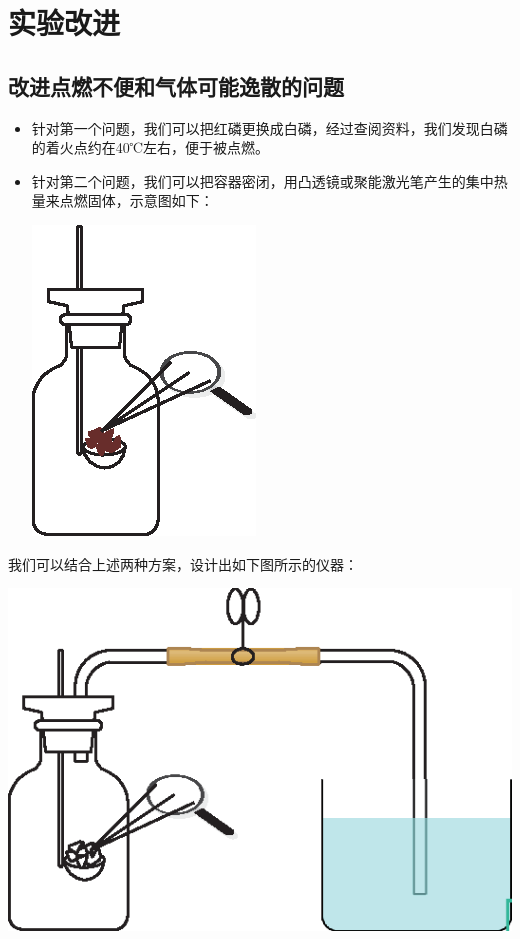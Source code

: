 \documentclass[11pt,a4paper,titlepage,twocolumn]{ctexart}
\begin{document}
	\section{实验改进}
	\subsection{改进点燃不便和气体可能逸散的问题}
	\begin{itemize}
		\item 针对第一个问题，我们可以把红磷更换成白磷，经过查阅资料，我们发现白磷的着火点约在40℃左右，便于被点燃。
		\item 针对第二个问题，我们可以把容器密闭，用凸透镜或聚能激光笔产生的集中热量来点燃固体，示意图如下：\\
		\begin{center}
			\includegraphics[width=0.4\linewidth]{fig/2}
		\end{center}
		
	\end{itemize}
	
	我们可以结合上述两种方案，设计出如下图所示的仪器：
	
	\begin{center}
		\includegraphics[width=0.8\linewidth]{fig/3}
	\end{center}
	
\end{document}
